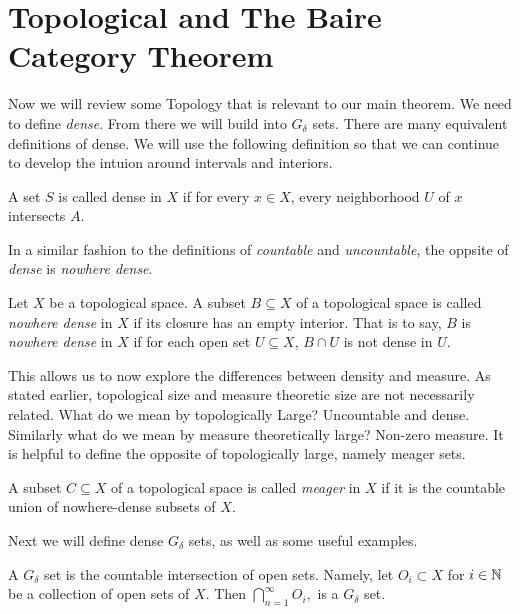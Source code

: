 \section{Topological and The Baire Category Theorem}
Now we will review some Topology that is relevant to our main theorem.  We need to define \textit{dense}.  From there we will build into $G_\delta$ sets.     There are many equivalent definitions of dense.  We will use the following definition so that we can continue to develop the intuion around intervals and interiors. 

\begin{definition}[Dense]
    A set $S$ is called dense in $X$ if for every $x \in X$, every neighborhood $U$ of $x$ intersects $A$.  
\end{definition}


In a similar fashion to the definitions of \textit{countable} and \textit{uncountable}, the oppsite of \textit{dense} is \textit{nowhere dense}.

\begin{definition}  Let $X$ be a topological space.  A subset $B \subseteq X$ of a topological space is called \textit{nowhere dense} in $X$ if its closure has an empty interior.  That is to say, $B$ is \textit{nowhere dense} in $X$ if for each open set $U\subseteq X$, $B\cap U$ is not dense in $U$.      
\end{definition}



This allows us to now explore the differences between density and measure.  As stated earlier, topological size and measure theoretic size are not necessarily related.  What do we mean by topologically Large? Uncountable and dense.  Similarly what do we mean by measure theoretically large?  Non-zero measure. It is helpful to define the opposite of topologically large, namely meager sets.



\begin{definition}[Meager]  A subset $C \subseteq X$ of a topological space is called \textit{meager} in $X$ if it is the countable union of nowhere-dense subsets of $X$.    
\end{definition}

Next we will define dense $G_\delta$ sets, as well as some useful examples.  
\begin{definition}
    A $G_\delta$ set is the countable intersection of open sets.  Namely, let $O_i \subset X$ for $i \in \mathbb{N}$ be a collection of open sets of $X$.  Then 
    $\bigcap_{n=1}^\infty O_i,$ is a $G_\delta$ set.  
\end{definition}

